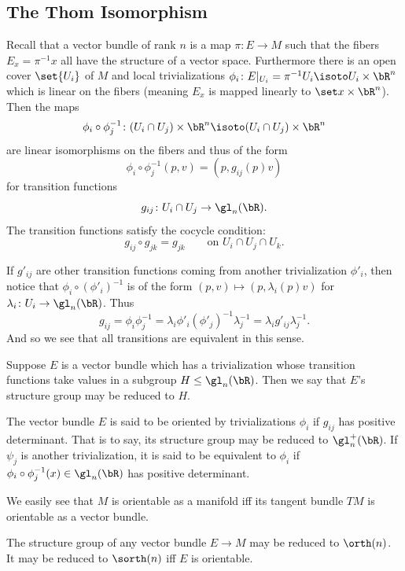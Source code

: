 \subsection{The Thom Isomorphism}

Recall that a vector bundle of rank $n$ is a map $\pi\colon E\to M$ such that the fibers $E_x=\pi^{-1}x$ all have the structure of a vector space.
Furthermore there is an open cover $\set{U_i}$ of $M$ and local trivializations $\phi_i\colon E|_{U_i}=\pi^{-1}U_i\isoto U_i\times\bR^n$ which is linear
on the fibers (meaning $E_x$ is mapped linearly to $\set x\times\bR^n$).
Then the maps
$$ \phi_i\circ\phi_j^{-1}\colon(U_i\cap U_j)\times\bR^n \isoto (U_i\cap U_j)\times\bR^n $$
are linear isomorphisms on the fibers and thus of the form
$$ \phi_i\circ\phi_j^{-1}(p,v) = (p,g_{ij}(p)v) $$
for {\emphcolor transition functions}
$$ g_{ij} \colon U_i\cap U_j \to \gl_n(\bR) . $$
The transition functions satisfy the {\emphcolor cocycle condition}:
$$ g_{ij}\circ g_{jk} = g_{jk}\qquad\text{on $U_i\cap U_j\cap U_k$.} $$

If $g'_{ij}$ are other transition functions coming from another trivialization $\phi'_i$, then notice that $\phi_i\circ(\phi'_i)^{-1}$ is of the form
$(p,v)\mapsto(p,\lambda_i(p)v)$ for $\lambda_i\colon U_i\to\gl_n(\bR)$.
Thus
$$ g_{ij} = \phi_i\phi_j^{-1} = \lambda_i\phi'_i(\phi'_j)^{-1}\lambda_j^{-1} = \lambda_ig'_{ij}\lambda_j^{-1} . $$
And so we see that all transitions are equivalent in this sense.

\bdefn

    Suppose $E$ is a vector bundle which has a trivialization whose transition functions take values in a subgroup $H\leq\gl_n(\bR)$.
    Then we say that {\emphcolor $E$'s structure group may be reduced to $H$}.

    The vector bundle $E$ is said to be {\emphcolor oriented} by trivializations $\phi_i$ if $g_{ij}$ has positive determinant.
    That is to say, its structure group may be reduced to $\gl_n^+(\bR)$.
    If $\psi_j$ is another trivialization, it is said to be {\emphcolor equivalent} to $\phi_i$ if $\phi_i\circ\phi_j^{-1}(x)\in\gl_n(\bR)$
    has positive determinant.

\edefn

We easily see that $M$ is orientable as a manifold iff its tangent bundle $TM$ is orientable as a vector bundle.

\blemm

    The structure group of any vector bundle $E\to M$ may be reduced to $\orth(n)$.
    It may be reduced to $\sorth(n)$ iff $E$ is orientable.

